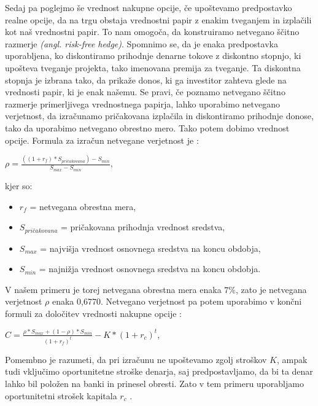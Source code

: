 \documentclass[12pt, a4paper]{amsart}
\theoremstyle{definition} %
\theoremstyle{plain} %
\begin{document}
Sedaj pa poglejmo še vrednost nakupne opcije, če upoštevamo predpostavko realne opcije, da na trgu obstaja vrednostni papir z enakim tveganjem in izplačili kot naš vrednostni papir. To nam omogoča, da konstruiramo netvegano ščitno razmerje \textit{(angl. risk-free hedge)}. Spomnimo se, da je enaka predpostavka uporabljena, ko diskontiramo prihodnje denarne tokove z diskontno stopnjo, ki upošteva tveganje projekta, tako imenovana premija za tveganje. Ta diskontna stopnja je izbrana tako, da prikaže donos, ki ga investitor zahteva glede na vrednosti papir, ki je enak našemu. Se pravi, če poznamo netvegano ščitno razmerje primerljivega vrednostnega papirja, lahko uporabimo netvegano verjetnost, da izračunamo pričakovana izplačila in diskontiramo prihodnje donose, tako da uporabimo netvegano obrestno mero. Tako potem dobimo vrednost opcije. Formula za izračun netvegane verjetnost je \cite[str. 53, 54]{Brach}:
\begin{center}
$\rho = \tfrac{((1+r_f) * S_{pričakovana}) - S_{min}}{S_{max} - S_{min}}$,
\end{center}
kjer so: \\
\begin{itemize}
\item $r_f$ = netvegana obrestna mera,
\item $S_{pričakovana}$ = pričakovana prihodnja vrednost sredstva,
\item $S_{max}$ = najvišja vrednost osnovnega sredstva na koncu obdobja,
\item $S_{min}$ = najnižja vrednost osnovnega sredstva na koncu obdobja.
\end{itemize}

V našem primeru je torej netvegana obrestna mera enaka $7 \%$, zato je netvegana verjetnost $\rho$ enaka 0,6770. Netvegano verjetnost pa potem uporabimo v končni formuli za določitev vrednosti nakupne opcije \cite[str. 54]{Brach}:
\begin{center}
$C = \tfrac{\rho * S_{max} + (1-\rho) * S_{min}}{(1+r_f)^t} - K *(1 +  r_c)^t$,
\end{center}
Pomembno je razumeti, da pri izračunu ne upoštevamo zgolj stroškov $K$, ampak tudi vključimo oportunitetne stroške denarja, saj predpostavljamo, da bi ta denar lahko bil položen na banki in prinesel obresti. Zato v tem primeru uporabljamo oportunitetni strošek kapitala $r_c$ \cite[str. 54]{Brach}.\\
\end{document}
